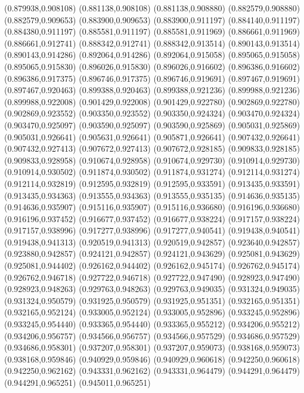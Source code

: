 (0.879938,0.908108)
(0.881138,0.908108)
(0.881138,0.908880)
(0.882579,0.908880)
(0.882579,0.909653)
(0.883900,0.909653)
(0.883900,0.911197)
(0.884140,0.911197)
(0.884380,0.911197)
(0.885581,0.911197)
(0.885581,0.911969)
(0.886661,0.911969)
(0.886661,0.912741)
(0.888342,0.912741)
(0.888342,0.913514)
(0.890143,0.913514)
(0.890143,0.914286)
(0.892064,0.914286)
(0.892064,0.915058)
(0.895065,0.915058)
(0.895065,0.915830)
(0.896026,0.915830)
(0.896026,0.916602)
(0.896386,0.916602)
(0.896386,0.917375)
(0.896746,0.917375)
(0.896746,0.919691)
(0.897467,0.919691)
(0.897467,0.920463)
(0.899388,0.920463)
(0.899388,0.921236)
(0.899988,0.921236)
(0.899988,0.922008)
(0.901429,0.922008)
(0.901429,0.922780)
(0.902869,0.922780)
(0.902869,0.923552)
(0.903350,0.923552)
(0.903350,0.924324)
(0.903470,0.924324)
(0.903470,0.925097)
(0.903590,0.925097)
(0.903590,0.925869)
(0.905031,0.925869)
(0.905031,0.926641)
(0.905631,0.926641)
(0.905871,0.926641)
(0.907432,0.926641)
(0.907432,0.927413)
(0.907672,0.927413)
(0.907672,0.928185)
(0.909833,0.928185)
(0.909833,0.928958)
(0.910674,0.928958)
(0.910674,0.929730)
(0.910914,0.929730)
(0.910914,0.930502)
(0.911874,0.930502)
(0.911874,0.931274)
(0.912114,0.931274)
(0.912114,0.932819)
(0.912595,0.932819)
(0.912595,0.933591)
(0.913435,0.933591)
(0.913435,0.934363)
(0.913555,0.934363)
(0.913555,0.935135)
(0.914636,0.935135)
(0.914636,0.935907)
(0.915116,0.935907)
(0.915116,0.936680)
(0.916196,0.936680)
(0.916196,0.937452)
(0.916677,0.937452)
(0.916677,0.938224)
(0.917157,0.938224)
(0.917157,0.938996)
(0.917277,0.938996)
(0.917277,0.940541)
(0.919438,0.940541)
(0.919438,0.941313)
(0.920519,0.941313)
(0.920519,0.942857)
(0.923640,0.942857)
(0.923880,0.942857)
(0.924121,0.942857)
(0.924121,0.943629)
(0.925081,0.943629)
(0.925081,0.944402)
(0.926162,0.944402)
(0.926162,0.945174)
(0.926762,0.945174)
(0.926762,0.946718)
(0.927722,0.946718)
(0.927722,0.947490)
(0.928923,0.947490)
(0.928923,0.948263)
(0.929763,0.948263)
(0.929763,0.949035)
(0.931324,0.949035)
(0.931324,0.950579)
(0.931925,0.950579)
(0.931925,0.951351)
(0.932165,0.951351)
(0.932165,0.952124)
(0.933005,0.952124)
(0.933005,0.952896)
(0.933245,0.952896)
(0.933245,0.954440)
(0.933365,0.954440)
(0.933365,0.955212)
(0.934206,0.955212)
(0.934206,0.956757)
(0.934566,0.956757)
(0.934566,0.957529)
(0.934686,0.957529)
(0.934686,0.958301)
(0.937207,0.958301)
(0.937207,0.959073)
(0.938168,0.959073)
(0.938168,0.959846)
(0.940929,0.959846)
(0.940929,0.960618)
(0.942250,0.960618)
(0.942250,0.962162)
(0.943331,0.962162)
(0.943331,0.964479)
(0.944291,0.964479)
(0.944291,0.965251)
(0.945011,0.965251)
